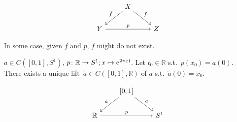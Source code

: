 \documentclass[openany, oneside, a5paper]{book}
\begin{document}
\begin{equation*}
\begin{tikzcd}
    & X \arrow[rd, "f"] \arrow[ld, "\tilde f"'] &   \\
Y \arrow[rr, "p"] &                                           & Z
\end{tikzcd}
\end{equation*}

In some case, given $f$ and $p$, $\tilde f$ might do not exist.

\begin{lemma}
    $a \in C([0, 1], S^1)$, $p \colon \mathbb R \to S^1; x \mapsto \mathrm{e}^{2\pi x \mathrm{i}}$. Let $t_0 \in \mathbb R$ s.t.\ $p(x_0) = a(0)$.
    There exists a unique lift~$\tilde a \in C([0, 1], \mathbb R)$ of $a$ s.t.\ $\tilde a(0) = x_0$.
\end{lemma}

\begin{equation*}
\begin{tikzcd}
    & {[0, 1]} \arrow[rd, "a"] \arrow[ld, "\tilde a"'] &     \\
\mathbb R \arrow[rr, "p"] &                                                  & S^1
\end{tikzcd}
\end{equation*}
\end{document}
